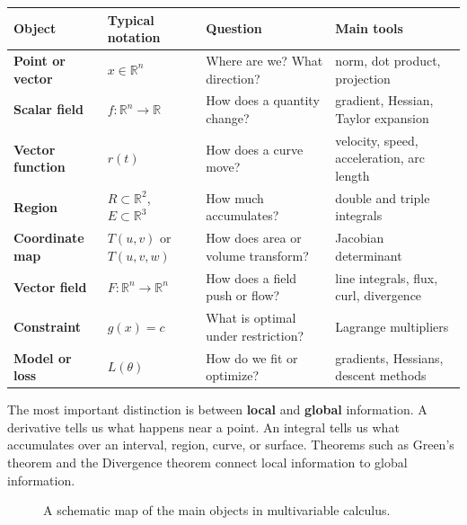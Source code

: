 \documentclass[11pt]{article}
\newcommand{\R}{\mathbb R}
\begin{document}
\begin{center}
\renewcommand{\arraystretch}{1.15}
\begin{tabularx}{\textwidth}{>{\bfseries}p{}p{}X p{}}
\toprule
Object & Typical notation & Question & Main tools\\
\midrule
Point or vector & $x\in\R^n$ & Where are we? What direction? & norm, dot product, projection\\
Scalar field & $f:\R^n\to\R$ & How does a quantity change? & gradient, Hessian, Taylor expansion\\
Vector function & $r(t)$ & How does a curve move? & velocity, speed, acceleration, arc length\\
Region & $R\subset\R^2$, $E\subset\R^3$ & How much accumulates? & double and triple integrals\\
Coordinate map & $T(u,v)$ or $T(u,v,w)$ & How does area or volume transform? & Jacobian determinant\\
Vector field & $F:\R^n\to\R^n$ & How does a field push or flow? & line integrals, flux, curl, divergence\\
Constraint & $g(x)=c$ & What is optimal under restriction? & Lagrange multipliers\\
Model or loss & $L(\theta)$ & How do we fit or optimize? & gradients, Hessians, descent methods\\
\bottomrule
\end{tabularx}
\end{center}

The most important distinction is between \textbf{local} and \textbf{global} information. A derivative tells us what happens near a point. An integral tells us what accumulates over an interval, region, curve, or surface. Theorems such as Green's theorem and the Divergence theorem connect local information to global information.

\begin{figure}[H]
\centering
{}
\caption{A schematic map of the main objects in multivariable calculus.}
\end{figure}
\end{document}
